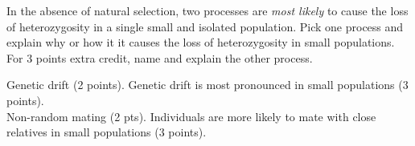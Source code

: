 \question[5]
In the absence of natural selection, two processes are \emph{most likely} to cause the loss of heterozygosity in a single small and isolated population. Pick one process and explain why or how it it causes the loss of heterozygosity in small populations. For 3 points extra credit, name and explain the other process.


\begin{solution}
Genetic drift (2 points). Genetic drift is most pronounced in small populations (3 points). \\
Non-random mating (2 pts).  Individuals are more likely to mate with close relatives in small populations (3 points).
\end{solution}
